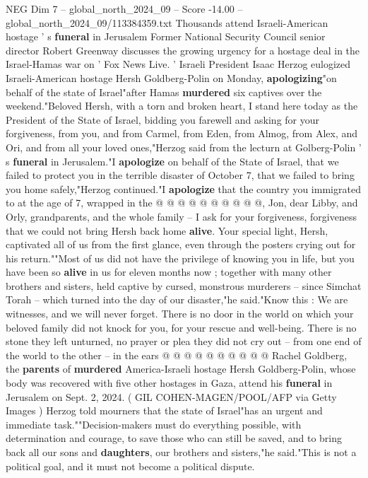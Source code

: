 \begin{textsample}{NEG Dim 7 – global\_north\_2024\_09 – Score -14.00 – global\_north\_2024\_09/113384359.txt}  \label{ex:f7_neg_003}
Thousands attend Israeli-American hostage ' s \textbf{funeral} in Jerusalem Former National Security Council senior director Robert Greenway discusses the growing urgency for a hostage deal in the Israel-Hamas war on ' Fox News Live. ' Israeli President Isaac Herzog eulogized Israeli-American hostage Hersh Goldberg-Polin on Monday, \textbf{apologizing}"on behalf of the state of Israel"after Hamas \textbf{murdered} six captives over the weekend."Beloved Hersh, with a torn and broken heart, I stand here today as the President of the State of Israel, bidding you farewell and asking for your forgiveness, from you, and from Carmel, from Eden, from Almog, from Alex, and Ori, and from all your loved ones,"Herzog said from the lecturn at Golberg-Polin ' s \textbf{funeral} in Jerusalem."I \textbf{apologize} on behalf of the State of Israel, that we failed to protect you in the terrible disaster of October 7, that we failed to bring you home safely,"Herzog continued."I \textbf{apologize} that the country you immigrated to at the age of 7, wrapped in the @ @ @ @ @ @ @ @ @ @, Jon, dear Libby, and Orly, grandparents, and the whole family -- I ask for your forgiveness, forgiveness that we could not bring Hersh back home \textbf{alive}.
Your special light, Hersh, captivated all of us from the first glance, even through the posters crying out for his return.""Most of us did not have the privilege of knowing you in life, but you have been so \textbf{alive} in us for eleven months now ; together with many other brothers and sisters, held captive by cursed, monstrous murderers -- since Simchat Torah -- which turned into the day of our disaster,"he said."Know this : We are witnesses, and we will never forget.
There is no door in the world on which your beloved family did not knock for you, for your rescue and well-being.
There is no stone they left unturned, no prayer or plea they did not cry out -- from one end of the world to the other -- in the ears @ @ @ @ @ @ @ @ @ @ Rachel Goldberg, the \textbf{parents} of \textbf{murdered} America-Israeli hostage Hersh Goldberg-Polin, whose body was recovered with five other hostages in Gaza, attend his \textbf{funeral} in Jerusalem on Sept. 2, 2024. ( GIL COHEN-MAGEN/POOL/AFP via Getty Images ) Herzog told mourners that the state of Israel"has an urgent and immediate task.""Decision-makers must do everything possible, with determination and courage, to save those who can still be saved, and to bring back all our sons and \textbf{daughters}, our brothers and sisters,"he said."This is not a political goal, and it must not become a political dispute.

\end{textsample}
